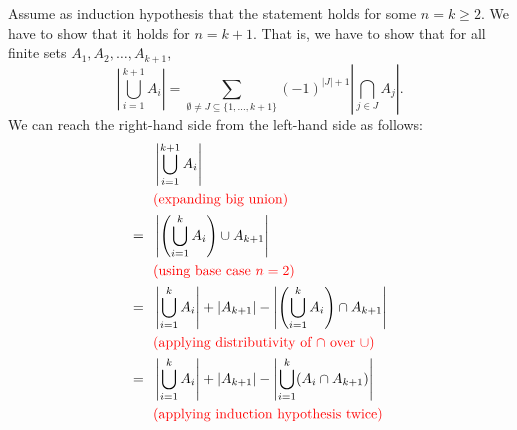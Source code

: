 \begin{solution}
	Assume as induction hypothesis that the statement holds for some $n=k\geq2$. We have to show that it holds for $n=k+1$. That is, we have to show that for all finite sets $A_1,A_2,\dots,A_{k+1}$, \[\left|\bigcup_{i=1}^{k+1} A_i\right| = \sum_{\emptyset\neq J\subseteq\{1,\dots,k+1\}}(-1)^{|J|+1}\left|\bigcap_{j\in J}A_j\right|.\]
	We can reach the right-hand side from the left-hand side as follows:
	\begingroup
	\allowdisplaybreaks %
	\begin{align*}
		    & \left|\bigcup_{i=1}^{k+1} A_i\right|                                                                                                                                                                                       \\
		    & \text{\red{(expanding big union)}}                                                                                                                                                                                         \\
		=~~ & \left|\left(\bigcup_{i=1}^{k} A_i\right)\cup A_{k+1}\right|                                                                                                                                                                \\
		    & \text{\red{(using base case $n=2$)}}                                                                                                                                                                                       \\
		=~~ & \left|\bigcup_{i=1}^{k} A_i\right| + |A_{k+1}| - \left|\left(\bigcup_{i=1}^{k} A_i\right)\cap A_{k+1}\right|                                                                                                               \\
		    & \text{\red{(applying distributivity of $\cap$ over $\cup$)}}                                                                                                                                                               \\
		=~~ & \left|\bigcup_{i=1}^{k} A_i\right| + |A_{k+1}| - \left|\bigcup_{i=1}^{k} (A_i\cap A_{k+1})\right|                                                                                                                          \\
		    & \text{\red{(applying induction hypothesis twice)}}                                                                                                                                                                         \\

\end{align*}
\end{solution}
